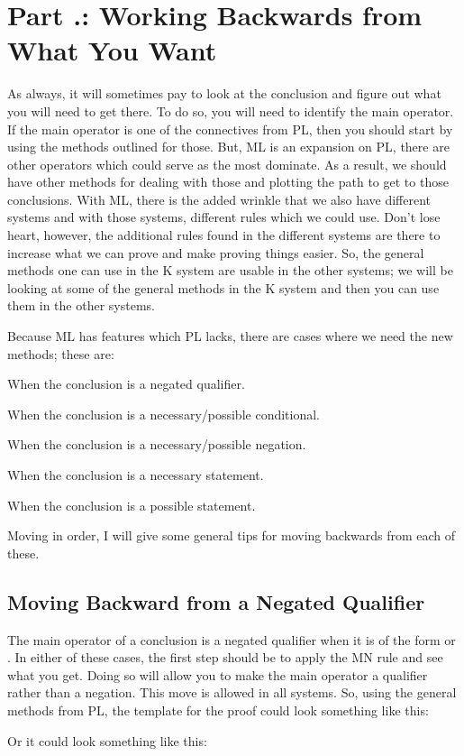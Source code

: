 \section{Part \thechapcount.\theseccount: Working Backwards from What You Want}
As always, it will sometimes pay to look at the conclusion and figure out what you will need to get there. To do so, you will need to identify the main operator. If the main operator is one of the connectives from PL, then you should start by using the methods outlined for those. But, ML is an expansion on PL, there are other operators which could serve as the most dominate. As a result, we should have other methods for dealing with those and plotting the path to get to those conclusions. With ML, there is the added wrinkle that we also have different systems and with those systems, different rules which we could use. Don't lose heart, however, the additional rules found in the different systems are there to increase what we can prove and make proving things easier. So, the general methods one can use in the K system are usable in the other systems; we will be looking at some of the general methods in the K system and then you can use them in the other systems. 

Because ML has features which PL lacks, there are cases where we need the new methods; these are:
\begin{ebullet}
\item[\textbullet]When the conclusion is a negated qualifier.
\item[\textbullet]When the conclusion is a necessary/possible conditional.
\item[\textbullet]When the conclusion is a necessary/possible negation.
\item[\textbullet]When the conclusion is a necessary statement.
\item[\textbullet]When the conclusion is a possible statement.
\end{ebullet}
Moving in order, I will give some general tips for moving backwards from each of these.
\subsection{Moving Backward from a Negated Qualifier}
The main operator of a conclusion is a negated qualifier when it is of the form \enot \ebox {} or \enot \ediamond {}. In either of these cases, the first step should be to apply the MN rule and see what you get. Doing so will allow you to make the main operator a qualifier rather than a negation. This move is allowed in all systems. So, using the general methods from PL, the template for the proof could look something like this:
\begin{fitchproof}
\ellipsesline
{}			
\ellipsesline
{}
\end{fitchproof}
Or it could look something like this:
\begin{fitchproof}
\ellipsesline
{}			
\ellipsesline
{}
\end{fitchproof}


